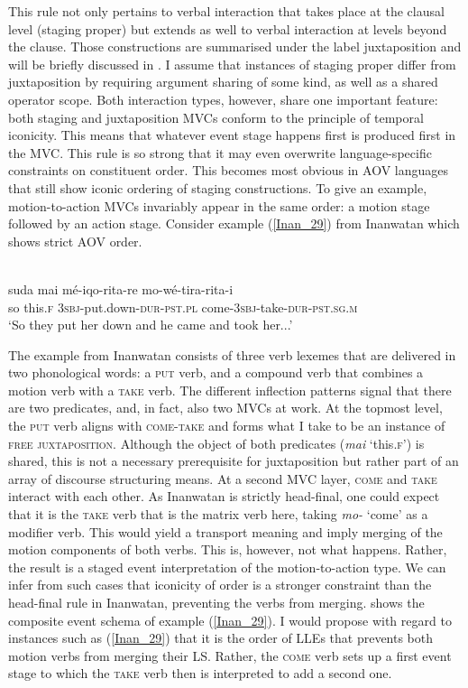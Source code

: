 This rule not only pertains to verbal interaction that takes place at the clausal level (staging proper) but extends as well to verbal interaction at levels beyond the clause. Those constructions are summarised under the label juxtaposition and will be briefly discussed in . I assume that instances of staging proper differ from juxtaposition by requiring argument sharing of some kind, as well as a shared operator scope. Both interaction types, however, share one important feature: both staging and juxtaposition MVCs conform to the principle of temporal iconicity. This means that whatever event stage happens first is produced first in the MVC. This rule is so strong that it may even overwrite language-specific constraints on constituent order. This becomes most obvious in AOV languages that still show iconic ordering of staging constructions. To give an example, motion-to-action MVCs invariably appear in the same order: a motion stage followed by an action stage. Consider example (\ref{Inan_29}) from Inanwatan which shows strict AOV order.

\ea \label{Inan_29}
\\
\gll suda mai mé-iqo-rita-re mo-wé-tira-rita-i \\
so this.\textsc{f} 3\textsc{sbj}-put.down-\textsc{dur}-\textsc{pst}.\textsc{pl} come-3\textsc{sbj}-take-\textsc{dur}-\textsc{pst}.\textsc{sg}.\textsc{m} \\
\glft `So they put her down and he came and took her...' \\ 
\z

The example from Inanwatan consists of three verb lexemes that are delivered in two phonological words: a \textsc{put} verb, and a compound verb that combines a motion verb with a \textsc{take} verb. The different inflection patterns signal that there are two predicates, and, in fact, also two MVCs at work. At the topmost level, the \textsc{put} verb aligns with \textsc{come-take} and forms what I take to be an instance of \textsc{free juxtaposition}. Although the object of both predicates (\textit{mai} `this.\textsc{f}') is shared, this is not a necessary prerequisite for juxtaposition but rather part of an array of discourse structuring means. At a second MVC layer, \textsc{come} and \textsc{take} interact with each other. As Inanwatan is strictly head-final, one could expect that it is the \textsc{take} verb that is the matrix verb here, taking \textit{mo-} `come' as a modifier verb. This would yield a transport meaning and imply merging of the motion components of both verbs. This is, however, not what happens. Rather, the result is a staged event interpretation of the motion-to-action type. We can infer from such cases that iconicity of order is a stronger constraint than the head-final rule in Inanwatan, preventing the verbs from merging.  shows the composite event schema of example (\ref{Inan_29}). I would propose with regard to instances such as (\ref{Inan_29}) that it is the order of LLEs that prevents both motion verbs from merging their LS. Rather, the \textsc{come} verb sets up a first event stage to which the \textsc{take} verb then is interpreted to add a second one.

